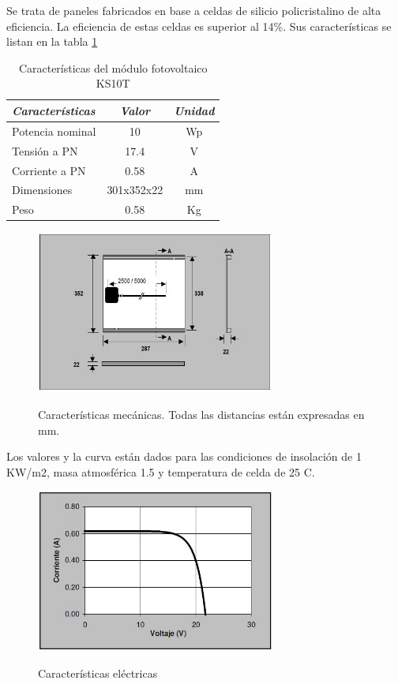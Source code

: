 Se trata de paneles fabricados en base a celdas de silicio policristalino de alta eficiencia. La eficiencia de estas celdas es superior al 14\%. Sus características se listan en la tabla \ref{tab:ks10t}

\vspace{10px}

\begin{table}[ht]
	\centering
	\caption{Características del módulo fotovoltaico KS10T}
	\begin{tabular}{@{} l *2c @{}}    \toprule
		\emph{\textbf{Características}} & \emph{\textbf{Valor}} & \emph{\textbf{Unidad}}\\
		\midrule
		Potencia nominal	& 10 	& Wp	\\	
		Tensión a PN		& 17.4	& V\\
		Corriente a PN	& 0.58		& A\\
		Dimensiones		& 301x352x22 	& mm\\
		Peso				& 0.58		& Kg	\\
		\bottomrule
		\hline
	\end{tabular}
	\label{tab:ks10t}
\end{table}

\begin{figure}[h!]
	\centering
    \includegraphics[width=0.7\textwidth]{./Figures/mecanicas.JPG}
	\label{fig:mecanicas}
	\caption{Características mecánicas. Todas las distancias están expresadas en mm.}
\end{figure}

Los valores y la curva están dados para las condiciones de insolación de 1 KW/m2, masa atmosférica 1.5 y temperatura de celda de 25 \grados C.

\begin{figure}[h!]
	\centering
    \includegraphics[width=0.7\textwidth]{./Figures/curva.JPG}
	\label{fig:curva}
	\caption{Características eléctricas}
\end{figure}
